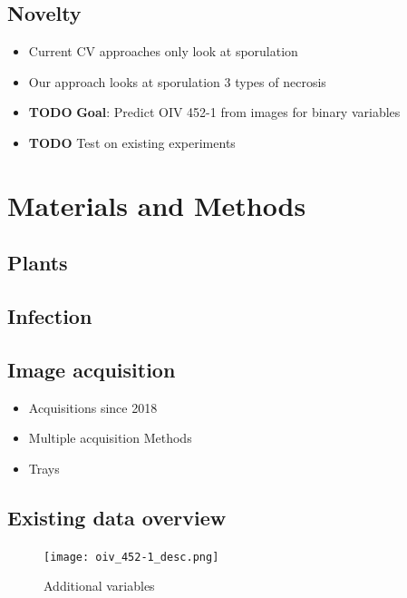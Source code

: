\documentclass[english]{article}
\begin{document}
\subsection{Novelty}

\begin{itemize}
	\item Current CV approaches only look at sporulation
	\item Our approach looks at sporulation 3 types of necrosis
	\item \textbf{TODO} \textbf{Goal}: Predict OIV 452-1 from images for binary variables
	\item \textbf{TODO} Test on existing experiments
\end{itemize}

\section{Materials and Methods}

\subsection{Plants}

\parencite{bellinResistancePlasmoparaViticola2009}

\subsection{Infection}

\parencite{bellinResistancePlasmoparaViticola2009}

\subsection{Image acquisition}

\begin{itemize}
	\item Acquisitions since 2018
	\item Multiple acquisition Methods
	\item Trays
\end{itemize}

\subsection{Existing data overview}

\begin{figure}
	\begin{center}
		\texttt{[image: oiv\_452-1\_desc.png]}
		\caption{Additional variables}\label{fig:newvariables}
	\end{center}
\end{figure}
\end{document}
